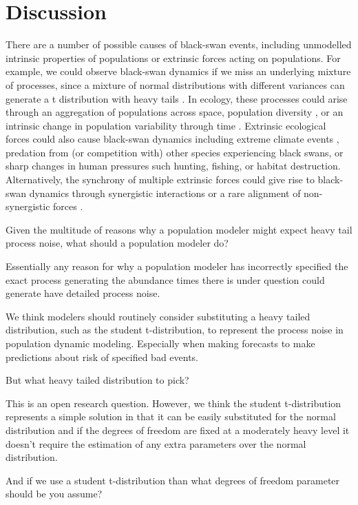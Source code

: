 \section{Discussion}

There are a number of possible causes of black-swan events, including
unmodelled intrinsic properties of populations or extrinsic forces acting on
populations. For example, we could observe black-swan dynamics if we miss an
underlying mixture of processes, since a mixture of normal distributions with
different variances can generate a t distribution with heavy
tails \citep{allen2001}. In ecology, these processes could arise through an
aggregation of populations across space, population
diversity \citep{schindler2010}, or an intrinsic change in population variability
through time \citep{carpenter2006}. Extrinsic ecological forces could also cause
black-swan dynamics \citep{nunez2012} including extreme climate
events \citep{meehl2004, katz2005, ipcc2012}, predation from (or competition
with) other species experiencing black swans, or sharp changes in human
pressures such hunting, fishing, or habitat destruction. Alternatively, the
synchrony of multiple extrinsic forces could give rise to black-swan dynamics
through synergistic interactions \citep{kirby2009} or a rare alignment of
non-synergistic forces \citep{denny2009}.

Given the multitude of reasons why a population modeler might expect heavy tail process noise, what should a population modeler do?

Essentially any reason for why a population modeler has incorrectly specified
the exact process generating the abundance times there is under question could
generate have detailed process noise.

We think modelers should routinely consider substituting a heavy tailed
distribution, such as the student t-distribution, to represent the process
noise in population dynamic modeling. Especially when making forecasts to make
predictions about risk of specified bad events.

But what heavy tailed distribution to pick?

This is an open research question. However, we think the student t-distribution
represents a simple solution in that it can be easily substituted for the
normal distribution and if the degrees of freedom are fixed at a moderately
heavy level it doesn't require the estimation of any extra parameters over the
normal distribution.

And if we use a student t-distribution than what degrees of freedom parameter should be you assume?

